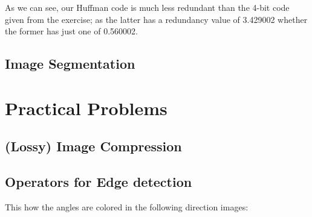 \documentclass[a4paper,12pt]{article}
\begin{document}
	
	\noindent As we can see, our Huffman code is much less redundant than the 4-bit code given from the exercise; as the latter has a redundancy value of 3.429002 whether the former has just one of 0.560002.
	
	\subsection{Image Segmentation}

	\section{Practical Problems}
	\subsection{(Lossy) Image Compression}
	\subsection{Operators for Edge detection}
	
	This how the angles are colored in the following direction images: \quad
	
\end{document}

